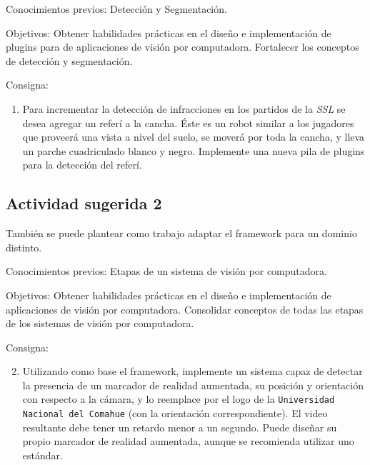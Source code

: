 \begin{description}

	\item{Conocimientos previos}: Detección y Segmentación.

	\item{Objetivos}: Obtener habilidades prácticas en el diseño e
		implementación de plugins para de aplicaciones de visión por
		computadora. Fortalecer los conceptos de detección y
		segmentación.

	\item{Consigna}: \begin{enumerate}

	\item{Para incrementar la detección de infracciones en los partidos de
		la \emph{SSL} se desea agregar un referí a la cancha. Éste es un
		robot similar a los jugadores que proveerá una vista a nivel del
		suelo, se moverá por toda la cancha, y lleva un parche
		cuadriculado blanco y negro. Implemente una nueva pila de
		plugins para la detección del referí.}

\end{enumerate}

\end{description}

\subsection{Actividad sugerida 2}

También se puede plantear como trabajo adaptar el framework para un dominio
distinto.

\begin{description}

	\item{Conocimientos previos}: Etapas de un sistema de visión por
		computadora.

	\item{Objetivos}: Obtener habilidades prácticas en el diseño e
		implementación de aplicaciones de visión por computadora.
		Consolidar conceptos de todas las etapas de los sistemas de
		visión por computadora.

	\item{Consigna}: \begin{enumerate}

	\setcounter{enumi}{1}

	\item{Utilizando como base el framework, implemente un sistema capaz de
		detectar la presencia de un marcador de realidad aumentada, su
		posición y orientación con respecto a la cámara, y lo reemplace
		por el logo de la \texttt{Universidad Nacional del Comahue} (con
		la orientación correspondiente). El video resultante debe tener
		un retardo menor a un segundo.  Puede diseñar su propio marcador
		de realidad aumentada, aunque se recomienda utilizar uno
		estándar.}

\end{enumerate}

\end{description}
